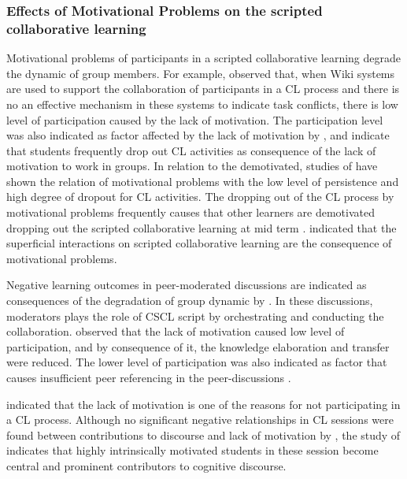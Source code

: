 \subsubsection{Effects of Motivational Problems on the scripted collaborative learning}

Motivational problems of participants in a scripted collaborative learning degrade the dynamic of group members. 
For example,  observed that, when Wiki systems are used to support the collaboration of participants in a CL process and there is no an effective mechanism in these systems to indicate task conflicts, there is low level of participation caused by the lack of motivation. 
The participation level was also indicated as factor affected by the lack of motivation by , and  indicate that students frequently drop out CL activities as consequence of the lack of motivation to work in groups.
In relation to the demotivated, studies of  have shown the relation of motivational problems with the low level of persistence and high degree of dropout for CL activities.
The dropping out of the CL process by motivational problems frequently causes that other learners are demotivated dropping out the scripted collaborative learning at mid term \cite{Hart2012, Dillenbourg2013}.
 indicated that the superficial interactions on scripted collaborative learning are the consequence of motivational problems.

Negative learning outcomes in peer-moderated discussions are indicated as consequences of the degradation of group dynamic by .
In these discussions, moderators plays the role of CSCL script by orchestrating and conducting the collaboration.  observed that the lack of motivation caused low level of participation, and by consequence of it, the knowledge elaboration and transfer were reduced.
The lower level of participation was also indicated as factor that causes insufficient peer referencing in the peer-discussions \cite{Hewitt2005}.

 indicated that the lack of motivation is one of the reasons for not participating in a CL process.
Although no significant negative relationships in CL sessions were found between contributions to discourse and lack of motivation by , the study of  indicates that highly intrinsically motivated students in these session become central and prominent contributors to cognitive discourse.

